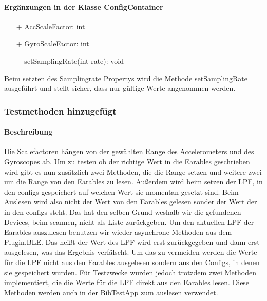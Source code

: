 \documentclass[a4paper,12pt]{article}
\begin{document}
\paragraph{Ergänzungen in der Klasse ConfigContainer}
\begin{itemize}
	\item[+] AccScaleFactor: int 
	\item[+] GyroScaleFactor: int
	\item[$-$]  setSamplingRate(int rate): void 
\end{itemize}
Beim setzten des Samplingrate Propertys wird die Methode setSamplingRate ausgeführt und stellt sicher, dass nur gültige Werte angenommen werden.

\subsubsection{Testmethoden hinzugefügt}
\paragraph{Beschreibung}
Die Scalefactoren hängen von der gewählten Range des Accelerometers und des Gyroscopes ab. Um zu testen ob der richtige Wert in die  Earables geschrieben wird gibt es nun zusätzlich zwei Methoden, die die Range setzen und weitere zwei um die Range von den Earables zu lesen.
Außerdem wird beim setzen der LPF, in den configs gespeichert auf welchen Wert sie momentan gesetzt sind. Beim Auslesen wird also nicht der Wert von den Earables gelesen sonder der Wert der in den configs steht. Das hat den selben Grund weshalb wir die gefundenen Devices, beim scannen, nicht als Liste zurückgeben. Um den aktuellen LPF der Earables auszulesen benutzen wir wieder asynchrone Methoden aus dem Plugin.BLE. Das heißt der Wert des LPF wird erst zurückgegeben und dann erst ausgelesen, was das Ergebnis verfälscht. Um das zu vermeiden werden die Werte für die LPF nicht aus den Earables ausgelesen sondern aus den Configs, in denen sie gespeichert wurden. Für Testzwecke wurden jedoch trotzdem zwei Methoden implementiert, die die Werte für die LPF direkt aus den Earables lesen. Diese Methoden werden auch in der BibTestApp zum auslesen verwendet.
\end{document}
